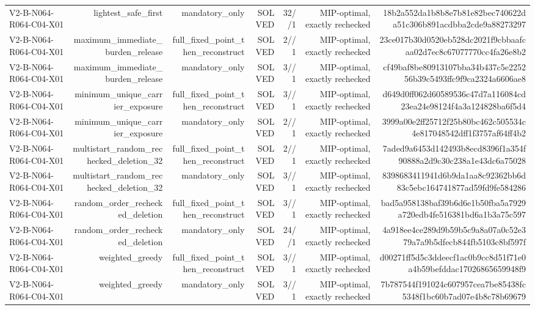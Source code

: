 {\begin{longtable}{lrrrrrr}
V2-B-N064-R064-C04-X01 & lightest\_safe\_first & mandatory\_only & SOLVED & 32//1 & MIP-optimal, exactly rechecked & 18b2a552da1b8b8e7b81e82bec740622da51c306b891acdbba2cde9a88273297 \\
V2-B-N064-R064-C04-X01 & maximum\_immediate\_burden\_release & full\_fixed\_point\_then\_reconstruct & SOLVED & 2//1 & MIP-optimal, exactly rechecked & 23ce017b30d0520eb528dc2021f9cbbaafcaa02d7ec8c67077770cc4fa26e8b2 \\
V2-B-N064-R064-C04-X01 & maximum\_immediate\_burden\_release & mandatory\_only & SOLVED & 3//1 & MIP-optimal, exactly rechecked & cf49baf8be80913107bba34b437c5e225256b39c5493ffc9f9ca2324a6606ae8 \\
V2-B-N064-R064-C04-X01 & minimum\_unique\_carrier\_exposure & full\_fixed\_point\_then\_reconstruct & SOLVED & 3//1 & MIP-optimal, exactly rechecked & d649d0ff062d60589536c47d7a116084cd23ea24e98124f4a3a124828ba6f5d4 \\
V2-B-N064-R064-C04-X01 & minimum\_unique\_carrier\_exposure & mandatory\_only & SOLVED & 2//1 & MIP-optimal, exactly rechecked & 3999a00e2ff25712f25b80bc462c505534c4e817048542dff1f3757af64ff4b2 \\
V2-B-N064-R064-C04-X01 & multistart\_random\_rechecked\_deletion\_32 & full\_fixed\_point\_then\_reconstruct & SOLVED & 2//1 & MIP-optimal, exactly rechecked & 7aded9a6453d142493b8ecd8396f1a354f90888a2d9c30c238a1e43dc6a75028 \\
V2-B-N064-R064-C04-X01 & multistart\_random\_rechecked\_deletion\_32 & mandatory\_only & SOLVED & 3//1 & MIP-optimal, exactly rechecked & 8398683411941d6b9da1aa8c92362bb6d83c5ebc164741877ad59fd9fe584286 \\
V2-B-N064-R064-C04-X01 & random\_order\_rechecked\_deletion & full\_fixed\_point\_then\_reconstruct & SOLVED & 3//1 & MIP-optimal, exactly rechecked & bad5a958138baf39b6d6e1b50fba5a7929a720edb4fe516381bd6a1b3a75c597 \\
V2-B-N064-R064-C04-X01 & random\_order\_rechecked\_deletion & mandatory\_only & SOLVED & 24//1 & MIP-optimal, exactly rechecked & 4a918ee4ce289d9b59b5c9a8a07a0c52e379a7a9b5dfecb844fb5103c8bf597f \\
V2-B-N064-R064-C04-X01 & weighted\_greedy & full\_fixed\_point\_then\_reconstruct & SOLVED & 3//1 & MIP-optimal, exactly rechecked & d00271ff5d5c3ddeecf1ac0b9cc8d51f71e0a4b59befddac17026865659948f9 \\
V2-B-N064-R064-C04-X01 & weighted\_greedy & mandatory\_only & SOLVED & 3//1 & MIP-optimal, exactly rechecked & 7b787544f191024c607957cea7be85438fc5348f1bc60b7ad07e4b8c78b69679 \\

\end{longtable}}
